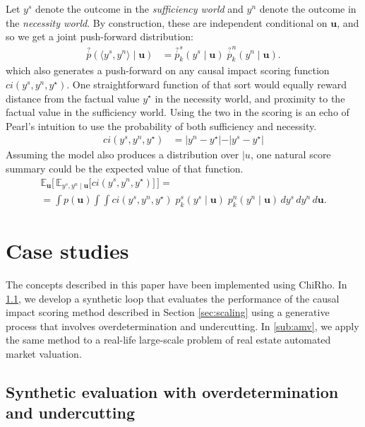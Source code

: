 \documentclass[twoside,11pt]{article}
\begin{document}
Let $y^s$ denote the outcome in the \emph{sufficiency world} and $y^n$ denote the outcome in the \emph{necessity world}. By construction, these are independent conditional on $\mathbf{u}$, and so we get a joint push-forward distribution:
\begin{align}
\overset{?}{p}(\langle y^s, y^n \rangle \mid \mathbf{u})  & = \overset{?}{p}^s_k(y^s \mid \mathbf{u}) \; \overset{?}{p}^n_k(y^n \mid \mathbf{u}).
\end{align}
\noindent which also generates a push-forward on any causal impact scoring function $ci(y^s, y^n, y^\star)$.  One straightforward function of that sort would equally reward distance from the factual value $y^\star$ in the necessity world, and proximity to the factual value in the sufficiency world. Using the two in the scoring is an echo of Pearl's intuition to use the probability of both sufficiency and necessity.
\begin{align*}
ci(y^s, y^n, y^\star) & = \vert y^n - y^\star \vert   - \vert y^s - y ^\star \vert     
\end{align*}
Assuming the model also produces a distribution over $\vert{u}$, one natural score summary could be the expected value of that function.
\begin{align}\label{eq:score}
\mathbb{E}_{\mathbf{u}}\Big[\, \mathbb{E}_{y^s, y^n \mid \mathbf{u}} \big[ ci(y^s, y^n, y^\star) \big] \,\Big]
= \\  =\int p(\mathbf{u}) 
   \int \int ci(y^s, y^n, y^\star) \; p^s_k(y^s \mid \mathbf{u}) \; p^n_k(y^n \mid \mathbf{u}) 
   \, dy^s \, dy^n \, d\mathbf{u}. \nonumber
\end{align}






\section{Case studies}
\label{sec:case_studies}


The concepts described in this paper have been implemented using ChiRho.  In \ref{sub:synthetic}, we develop a synthetic loop that evaluates the performance of the causal impact scoring method described in Section \ref{sec:scaling} using a generative process that involves overdetermination and undercutting. In \ref{sub:amv}, we apply the same method to a real-life large-scale problem of real estate automated market valuation.



\subsection{Synthetic evaluation with overdetermination and undercutting}
\label{sub:synthetic}
\end{document}
